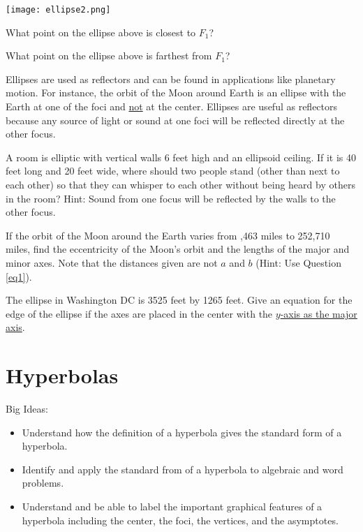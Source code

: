 \begin{center} \texttt{[image: ellipse2.png]}

\end{center}
\be
\item What point on the ellipse above is closest to $F_1$?
\item What point on the ellipse above is farthest from $F_1$?
\ee
\eq
\begin{info} Ellipses are used as reflectors and can be found in applications like planetary motion. For instance, the orbit of the Moon around Earth is an ellipse with the Earth at one of the foci and \underline{not} at the center. Ellipses are useful as reflectors because any source of light or sound at one foci will be reflected directly at the other focus. \end{info}

\bq A room is elliptic with vertical walls 6 feet high and an ellipsoid ceiling. If it is 40 feet long and 20 feet wide, where should two people stand (other than next to each other) so that they can whisper to each other without being heard by others in the room? Hint: Sound from one focus will be reflected by the walls to the other focus.
\eq

\bq If the orbit of the Moon around the Earth varies from ,463 miles to 252,710 miles, find the eccentricity of the Moon's orbit and the lengths of the major and minor axes. Note that the distances given are not $a$ and $b$ (Hint: Use Question \ref{eq1}).
\eq

\bq The ellipse in Washington DC is 3525 feet by 1265 feet. Give an equation for the edge of the ellipse if the axes are placed in the center with the \underline{$y$-axis as the major axis}. \eq 

\section{Hyperbolas}
Big Ideas:
\begin{itemize}
\item Understand how the definition of a hyperbola gives the standard form of a hyperbola.
\item Identify and apply the standard from of a hyperbola to algebraic and word problems.
\item Understand and be able to label the important graphical features of a hyperbola including the center, the foci, the vertices, and the asymptotes.
\end{itemize}


